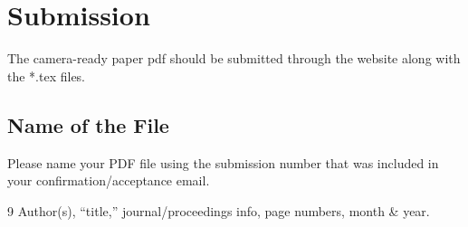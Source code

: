 \documentclass[12pt]{article}
\begin{document}
\section{Submission} \label{subm}
The camera-ready paper pdf should be submitted through the  website along with the *.tex files.

\subsection{Name of the File}
Please name your PDF file using the submission number that was included in your confirmation/acceptance email.

\begin{thebibliography}{9}
Author(s), ``title,'' journal/proceedings info, page numbers,
month \& year.
\end{thebibliography}
\end{document}
